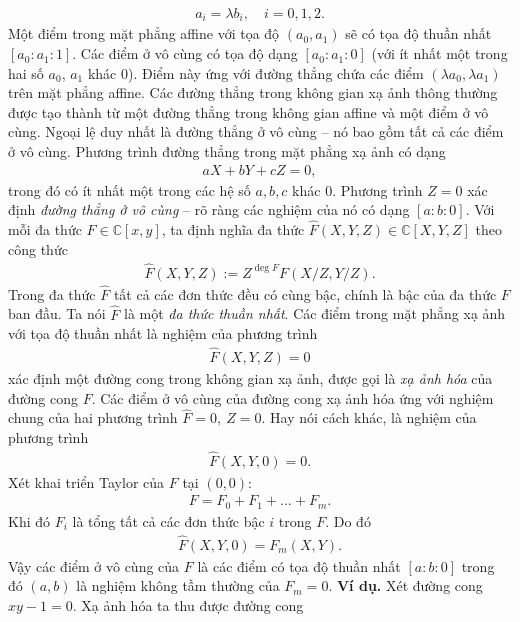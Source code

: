 \begin{multicols}{2}
\begin{align*}
		a_i=\lambda b_i, \quad i=0,1,2.
	\end{align*}
	Một điểm trong mặt phẳng affine với tọa độ $(a_0,a_1)$ sẽ có tọa độ thuần nhất $[a_0:a_1:1]$. Các điểm ở vô cùng có tọa độ dạng $[a_0:a_1:0]$ (với ít nhất một trong hai số $a_0$, $a_1$ khác $0$). Điểm này ứng với đường thẳng chứa các điểm $(\lambda a_0,\lambda a_1)$ trên mặt phẳng affine. 
	\vskip 0.1cm	
	Các đường thẳng trong không gian xạ ảnh thông thường được tạo thành từ một đường thẳng trong không gian affine và một điểm ở vô cùng. Ngoại lệ duy nhất là đường thẳng ở vô cùng -- nó bao gồm tất cả các điểm ở vô cùng.
	Phương trình đường thẳng trong mặt phẳng xạ ảnh có dạng
	\begin{align*}
		aX+bY+cZ=0,
	\end{align*}
	trong đó có ít nhất một trong các hệ số $a,b,c$ khác $0$. Phương trình
	$Z=0$ 
	xác định {\em đường thẳng ở vô cùng} -- rõ ràng các nghiệm của nó có dạng $[a:b:0]$.
	\vskip 0.1cm
	Với mỗi đa thức $F\in \mathbb C[x,y]$, ta định nghĩa đa thức $\widehat F(X,Y,Z)\in \mathbb C[X,Y,Z]$ theo công thức
	\begin{align*}
		\widehat F(X,Y,Z):=Z^{\deg F}F(X/Z,Y/Z).
	\end{align*}
	Trong đa thức $\widehat F$ tất cả các đơn thức đều có cùng bậc, chính là bậc của đa thức $ F$ ban đầu. Ta nói $\widehat F$ là một {\em đa thức thuần nhất}. 
	Các điểm trong mặt phẳng xạ ảnh với tọa độ thuần nhất là nghiệm của phương trình
	\begin{align*}
		\widehat F(X,Y,Z)=0
	\end{align*}
	xác định một đường cong trong không gian xạ ảnh, được gọi là  {\em xạ ảnh hóa} của đường cong $F$. 
	\vskip 0.1cm
	Các điểm ở vô cùng của đường cong xạ ảnh hóa ứng với nghiệm chung của hai  phương trình 
	$\widehat F=0,\ Z=0.$
	Hay nói cách khác, là nghiệm của phương trình
	\begin{align*}
		\widehat F(X,Y,0)=0.
	\end{align*}
	Xét khai triển Taylor của $F$ tại $(0,0)$:
	\begin{align*}
		F=F_0+F_1+\ldots + F_m.
	\end{align*}
	Khi đó $F_i$ là tổng tất cả các đơn thức bậc $i$ trong $F$. Do đó 
	\begin{align*}
		\widehat F(X,Y,0)= F_m(X,Y).
	\end{align*}
	Vậy các điểm ở vô cùng của $F$  là các điểm có tọa độ thuần nhất $[a:b:0]$ trong đó $(a,b)$ là nghiệm không tầm thường của $F_m=0$.
	\vskip 0.1cm
	\textbf{\color{duongvaotoanhoc}Ví dụ.} Xét đường cong $xy-1=0$. Xạ ảnh hóa ta thu được đường cong

\end{multicols}
